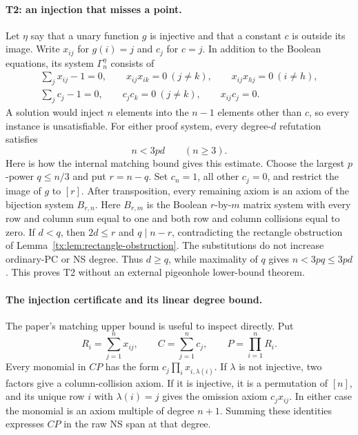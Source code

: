 \documentclass[11pt,a4paper,oneside,openany]{book}
\theoremstyle{definition}\newtheorem{definition}[theorem]{Definition}
\theoremstyle{remark}\newtheorem{remark}[theorem]{Remark}
\numberwithin{equation}{chapter}
\begin{document}
\paragraph{T2: an injection that misses a point.}
Let $\eta$ say that a unary function $g$ is injective and that a constant
$c$ is outside its image. Write $x_{ij}$ for $g(i)=j$ and $c_j$ for $c=j$.
In addition to the Boolean equations, its system $\Gamma_n^\eta$ consists of
\begin{equation}\label{tx:eq:G-witness}
\begin{gathered}
 \sum_jx_{ij}-1=0,\qquad
 x_{ij}x_{ik}=0\ (j\ne k),\qquad
 x_{ij}x_{hj}=0\ (i\ne h),\\
 \sum_jc_j-1=0,\qquad
 c_jc_k=0\ (j\ne k),\qquad x_{ij}c_j=0.
\end{gathered}
\end{equation}
A solution would inject $n$ elements into the $n-1$ elements other than $c$,
so every instance is unsatisfiable. For either proof system, every
degree-$d$ refutation satisfies
\[
 n<3pd\qquad(n\geq3).
\]
Here is how the internal matching bound gives this estimate. Choose the
largest $p$-power $q\leq n/3$ and put $r=n-q$. Set $c_n=1$, all other
$c_j=0$, and restrict the image of $g$ to $[r]$. After transposition, every
remaining axiom is an axiom of the bijection system $B_{r,n}$.
Here $B_{r,m}$ is the Boolean $r$-by-$m$ matrix system with every row and
column sum equal to one and both row and column collisions equal to zero.
If $d<q$, then $2d\leq r$ and $q\mid n-r$, contradicting the rectangle
obstruction of Lemma~\ref{tx:lem:rectangle-obstruction}. The substitutions do
not increase ordinary-PC or NS degree. Thus $d\geq q$, while maximality of
$q$ gives $n<3pq\leq3pd$. This proves T2 without an external pigeonhole
lower-bound theorem.

\paragraph{The injection certificate and its linear degree bound.}
The paper's matching upper bound is useful to inspect directly. Put
\[
 R_i=\sum_{j=1}^n x_{ij},\qquad C=\sum_{j=1}^n c_j,
                    \qquad P=\prod_{i=1}^n R_i.
\]
Every monomial in $CP$ has the form $c_j\prod_i x_{i,\lambda(i)}$.
If $\lambda$ is not injective, two factors give a column-collision
axiom. If it is injective, it is a permutation of $[n]$, and its
unique row $i$ with $\lambda(i)=j$ gives the omission axiom
$c_jx_{ij}$. In either case the monomial is an axiom multiple of
degree $n+1$. Summing these identities expresses $CP$ in the raw NS
span at that degree.
\end{document}
